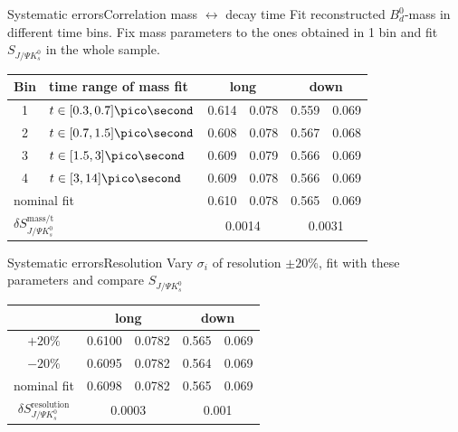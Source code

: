 \documentclass{beamer}
\newcommand{\Bd}{$B_d^0$}
\newcommand{\SJPsi}{S_{J/\Psi K_s^0}}
\begin{document}
\begin{frame}{Systematic errors}{Correlation mass $\leftrightarrow$ decay time}
Fit reconstructed \Bd-mass in different time bins. Fix mass parameters to the ones obtained in 1 bin and fit $\SJPsi$ in the whole sample.
\begin{center}
\begin{tabular}{c l r@{$\pm$}l r@{$\pm$}l}
\hline \hline
Bin & time range of mass fit & \multicolumn{2}{c}{long} & \multicolumn{2}{c}{down} \\ \hline
1 & $t \in [0.3, 0.7] \pico\second$ & 0.614 & 0.078 & 0.559 & 0.069 \\
2 & $t \in [0.7, 1.5] \pico\second$ & 0.608 & 0.078 & 0.567 & 0.068 \\
3 & $t \in [1.5, 3] \pico\second$ & 0.609 & 0.079 & 0.566 & 0.069 \\
4 & $t \in [3, 14] \pico\second$ & 0.609 & 0.078 &0.566 & 0.069 \\ \hline
\multicolumn{2}{l}{nominal fit}  & 0.610 & 0.078 & 0.565 & 0.069 \\ \hline
\multicolumn{2}{l}{$\delta\SJPsi^{\text{mass/t}}$} & \multicolumn{2}{c}{0.0014} & \multicolumn{2}{c}{0.0031} \\

\hline \hline
\end{tabular}
\end{center}
\end{frame}

\begin{frame}{Systematic errors}{Resolution}
Vary $\sigma_i$ of resolution $\pm 20\%$, fit with these parameters and compare $\SJPsi$
\begin{center}
\begin{tabular}{c r@{$\pm$}l r@{$\pm$}l}
\hline \hline
 & \multicolumn{2}{c}{long} & \multicolumn{2}{c}{down} \\ \hline
$+20\%$ &0.6100 & 0.0782& 0.565 & 0.069 \\
$-20\%$ & 0.6095 & 0.0782 & 0.564 & 0.069 \\ \hline
nominal fit & 0.6098 & 0.0782 & 0.565 & 0.069 \\ \hline
$\delta\SJPsi^{\text{resolution}}$ & \multicolumn{2}{c}{0.0003} & \multicolumn{2}{c}{0.001} \\
\hline \hline
\end{tabular}
\end{center}
\end{frame}
\end{document}
